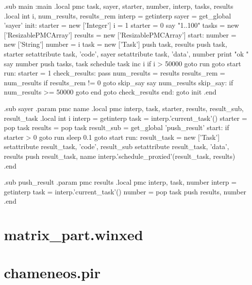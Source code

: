 \documentclass[bachelor,english]{hgbthesis}
\begin{document}
\begin{GenericCode}
.sub main :main
    .local pmc task, sayer, starter, number, interp, tasks, results
    .local int i, num_results, results_rem
    interp = getinterp
    sayer = get_global 'sayer'
init:
    starter = new ['Integer']
    i = 1
    starter = 0
    say "1..100"
    tasks = new ['ResizablePMCArray']
    results = new ['ResizablePMCArray']
start:
    number = new ['String']
    number = i
    task = new ['Task']
    push task, results
    push task, starter
    setattribute task, 'code', sayer
    setattribute task, 'data', number
    print "ok "
    say number
    push tasks, task
    schedule task
    inc i
    if i > 50000 goto run
    goto start
run:
    starter = 1
check_results:
    pass
    num_results = results
    results_rem = num_results %
    if results_rem != 0 goto skip_say
    say num_results
skip_say:
    if num_results >= 50000 goto end
    goto check_results
end:
    goto init
.end

.sub sayer
    .param pmc name
    .local pmc interp, task, starter, results, result_sub, result_task
    .local int i
    interp = getinterp
    task = interp.'current_task'()
    starter    = pop task
    results    = pop task
    result_sub = get_global 'push_result'
start:
    if starter > 0 goto run
    sleep 0.1
    goto start
run:
    result_task = new ['Task']
    setattribute result_task, 'code', result_sub
    setattribute result_task, 'data', results
    push result_task, name
    interp.'schedule_proxied'(result_task, results)
.end

.sub push_result
    .param pmc results
    .local pmc interp, task, number
    interp = getinterp
    task = interp.'current_task'()
    number = pop task
    push results, number
.end
\end{GenericCode}

\chapter{matrix\_part.winxed}
\label{app:matrix_part}



\chapter{chameneos.pir}
\label{app:chameneos_part}





\end{document}

